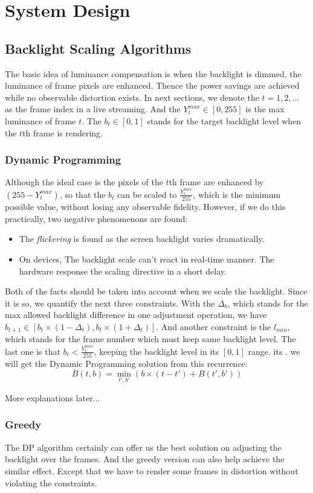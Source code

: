 \section{System Design}
\subsection{Backlight Scaling Algorithms}
The basic idea of luminance compensation is when the backlight is
dimmed, the luminance of frame pixels are enhanced. Thence the power
savings are achieved while no observable distortion exists. In next
sections, we denote the $t = 1, 2, ...$ as the frame index in a live
streaming. And the $Y_{t}^{max} \in [0, 255]$ is the max luminance of
frame $t$. The $b_{t} \in [0, 1]$ stands for the target backlight
level when the $t$th frame is rendering.

\subsubsection{Dynamic Programming}
Although the ideal case is the pixels of the $t$th frame are enhanced by
$(255 - Y_{t}^{max})$, so that the $b_{t}$ can be scaled to
$\frac{Y_{t}^{max}}{255}$, which is the minimum possible value, 
without losing any observable fidelity. However, if we do this
practically, two negative phenomenons are found:
\begin{itemize}
  \item{The {\it flickering} is found as the screen backlight varies
    dramatically.}
  \item{On devices, The backlight scale can't react in real-time
    manner. The hardware response the scaling directive in a short
    delay.}
\end{itemize}
Both of the facts should be taken into account when we scale the
backlight. Since it is so, we quantify the next three
constraints. With the $\Delta_{b}$, which stands for the max allowed
backlight difference in one adjustment operation, we have
$b_{t+1} \in [b_t \times (1 - \Delta_t), b_t \times (1 + \Delta_t)]$.  And another
constraint is the $l_{min}$, which stands for the frame number which
must keep same backlight level. The last one is that $b_{t} <
\frac{Y_{t}^{max}}{255}$, keeping the backlight level in its $[0,1]$
range.  its . we will get the Dynamic Programming solution from this
recurrence:
$$ B(t,b) = \min_{t',b'}(b \times (t - t') + B(t', b')) $$

More explanations later...

\subsubsection{Greedy}
The DP algorithm certainly can offer us the best solution on adjusting
the backlight over the frames. And the greedy version can also help
achieve the similar effect. Except that we have to render some frames
in distortion without violating the constraints.

